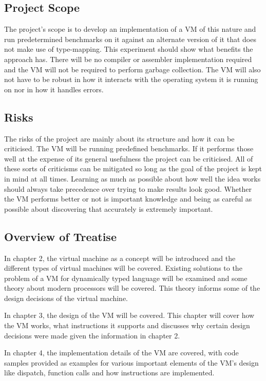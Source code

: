 \documentclass[english,a4paper]{article}
\begin{document}
\subsection{Project Scope}

The project's scope is to develop an implementation of a VM of this
nature and run predetermined benchmarks on it against an alternate
version of it that does not make use of type-mapping. This experiment
should show what benefits the approach has. There will be no compiler
or assembler implementation required and the VM will not be required
to perform garbage collection. The VM will also not have to be robust
in how it interacts with the operating system it is running on nor in
how it handles errors.

\subsection{Risks}
The risks of the project are mainly about its structure and how it can
be criticised. The VM will be running predefined benchmarks. If it
performs those well at the expense of its general usefulness the
project can be criticised. All of these sorts of criticisms can be
mitigated so long as the goal of the project is kept in mind at all
times. Learning as much as possible about how well the idea works
should always take precedence over trying to make results look
good. Whether the VM performs better or not is important knowledge and
being as careful as possible about discovering that accurately is
extremely important.

\subsection{Overview of Treatise}
In chapter 2, the virtual machine as a concept will be introduced and
the different types of virtual machines will be covered. Existing
solutions to the problem of a VM for dynamically typed language will
be examined and some theory about modern processors will be
covered. This theory informs some of the design decisions of the
virtual machine.

In chapter 3, the design of the VM will be covered. This chapter will
cover how the VM works, what instructions it supports and discusses
why certain design decisions were made given the information in
chapter 2.

In chapter 4, the implementation details of the VM are covered, with
code samples provided as examples for various important elements of
the VM's design like dispatch, function calls and how instructions are
implemented.
\end{document}
